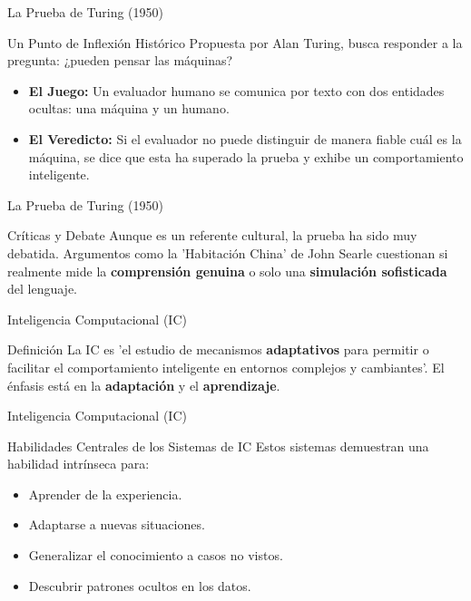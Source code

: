 \documentclass[aspectratio=169,xcolor=dvipsnames]{beamer}
\begin{document}
\begin{frame}{La Prueba de Turing (1950)}
    \begin{block}{Un Punto de Inflexión Histórico}
    Propuesta por Alan Turing, busca responder a la pregunta: ¿pueden pensar las máquinas?
    \begin{itemize}
        \item \textbf{El Juego:} Un evaluador humano se comunica por texto con dos entidades ocultas: una máquina y un humano.
        \item \textbf{El Veredicto:} Si el evaluador no puede distinguir de manera fiable cuál es la máquina, se dice que esta ha superado la prueba y exhibe un comportamiento inteligente.
    \end{itemize}
    \end{block}
\end{frame}
\begin{frame}{La Prueba de Turing (1950)}

    \begin{alertblock}{Críticas y Debate}
    Aunque es un referente cultural, la prueba ha sido muy debatida. Argumentos como la 'Habitación China' de John Searle cuestionan si realmente mide la \textbf{comprensión genuina} o solo una \textbf{simulación sofisticada} del lenguaje.
    \end{alertblock}
\end{frame}


\begin{frame}{Inteligencia Computacional (IC)}
    \begin{block}{Definición}
    La IC es 'el estudio de mecanismos \textbf{adaptativos} para permitir o facilitar el comportamiento inteligente en entornos complejos y cambiantes'. El énfasis está en la \textbf{adaptación} y el \textbf{aprendizaje}.
    \end{block}
\end{frame}
\begin{frame}{Inteligencia Computacional (IC)}
    \begin{alertblock}{Habilidades Centrales de los Sistemas de IC}
    Estos sistemas demuestran una habilidad intrínseca para:
        \begin{itemize}
            \item Aprender de la experiencia.
            \item Adaptarse a nuevas situaciones.
            \item Generalizar el conocimiento a casos no vistos.
            \item Descubrir patrones ocultos en los datos.
        \end{itemize}
    \end{alertblock}
\end{frame}
\end{document}
